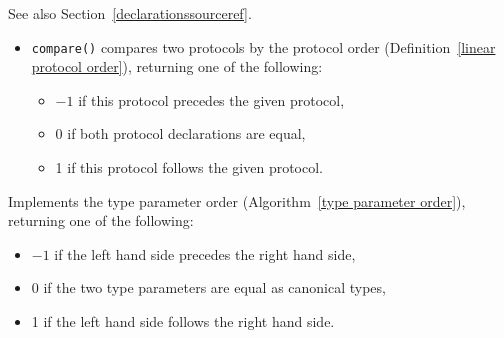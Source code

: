 \documentclass[../generics]{subfiles}
\begin{document}
See also Section~\ref{declarationssourceref}.
\begin{itemize}
\item \texttt{compare()} compares two protocols by the protocol order (Definition~\ref{linear protocol order}), returning one of the following:
\begin{itemize}
\item $-1$ if this protocol precedes the given protocol,
\item 0 if both protocol declarations are equal,
\item 1 if this protocol follows the given protocol.
\end{itemize}
\end{itemize}

Implements the type parameter order (Algorithm~\ref{type parameter order}), returning one of the following:
\begin{itemize}
\item $-1$ if the left hand side precedes the right hand side,
\item 0 if the two type parameters are equal as canonical types,
\item 1 if the left hand side follows the right hand side.
\end{itemize}
\end{document}
